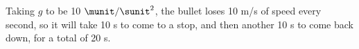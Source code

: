 Taking $g$ to be 10 $\munit/\sunit^2$, the bullet loses 10 m/s of
speed every second, so it will take 10 s to come to a
stop, and then another 10 s to come back down, for a total of 20 s.



